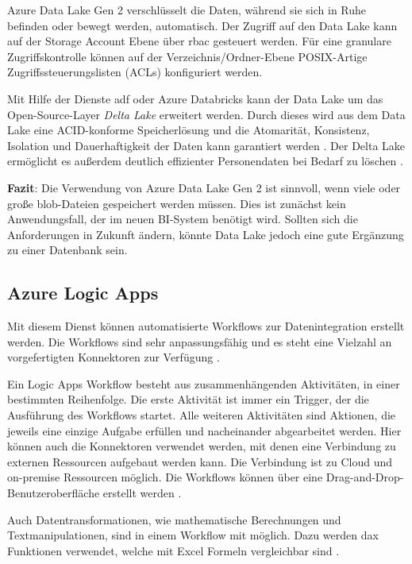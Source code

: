 Azure Data Lake Gen 2 verschlüsselt die Daten, während sie sich in Ruhe befinden oder bewegt werden, automatisch. Der Zugriff auf den Data Lake kann auf der Storage Account Ebene über \ac{rbac} gesteuert werden. Für eine granulare Zugriffskontrolle können auf der Verzeichnis/Ordner-Ebene POSIX-Artige Zugriffssteuerungslisten (ACLs) konfiguriert werden.

Mit Hilfe der Dienste \ac{adf} oder Azure Databricks kann der Data Lake um das Open-Source-Layer \textit{Delta Lake} erweitert werden. Durch dieses wird aus dem Data Lake eine ACID-konforme Speicherlösung und die Atomarität, Konsistenz, Isolation und Dauerhaftigkeit der Daten kann garantiert werden \cite{lesteve_definitive_2021}. Der Delta Lake ermöglicht es außerdem deutlich effizienter Personendaten bei Bedarf zu löschen \cite{brown_best_2021}.

\textbf{Fazit}: Die Verwendung von Azure Data Lake Gen 2 ist sinnvoll, wenn viele oder große \ac{blob}-Dateien gespeichert werden müssen. Dies ist zunächst kein Anwendungsfall, der im neuen BI-System benötigt wird. Sollten sich die Anforderungen in Zukunft ändern, könnte Data Lake jedoch eine gute Ergänzung zu einer Datenbank sein.


\subsection{Azure Logic Apps} \label{sec:grundlagen:azure_dienste:logicApps}
Mit diesem Dienst können automatisierte Workflows zur Datenintegration erstellt werden. Die Workflows sind sehr anpassungsfähig und es steht eine Vielzahl an vorgefertigten Konnektoren zur Verfügung \cite{kumar_serverless_2019}.

Ein Logic Apps Workflow besteht aus zusammenhängenden Aktivitäten, in einer bestimmten Reihenfolge. Die erste Aktivität ist immer ein Trigger, der die Ausführung des Workflows startet. Alle weiteren Aktivitäten sind Aktionen, die jeweils eine einzige Aufgabe erfüllen und nacheinander abgearbeitet werden. Hier können auch die Konnektoren verwendet werden, mit denen eine Verbindung zu externen Ressourcen aufgebaut werden kann. Die Verbindung ist zu Cloud und on-premise Ressourcen möglich. Die Workflows können über eine Drag-and-Drop-Benutzeroberfläche erstellt werden \cite{modi_azure_2020}.

Auch Datentransformationen, wie mathematische Berechnungen und Textmanipulationen, sind in einem Workflow mit möglich. Dazu werden \ac{dax} Funktionen verwendet, welche mit Excel Formeln vergleichbar sind \cite{bennett_enterprise_2021}.

